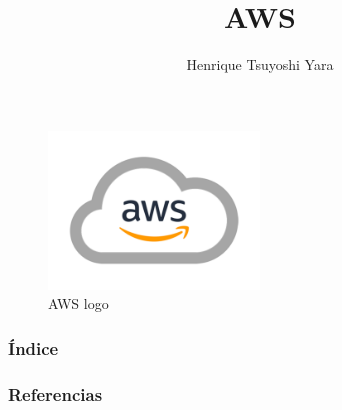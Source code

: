 \documentclass{beamer}
\title {AWS}
\author {Henrique Tsuyoshi Yara}
\institute {OPUS-software}
\begin{document}
\begin{frame}{\titlepage}
	\begin{figure}[htpb]
		\centering
		\includegraphics[width=0.5\textwidth]{aws-logo}
		\caption{AWS logo}
	\end{figure}
\end{frame}

\begin{frame}[allowframebreaks]
\frametitle{Índice}
\tableofcontents
\end{frame}















%
%

\begin{frame}[allowframebreaks]
\frametitle{Referencias}
\printbibliography
\end{frame}
\end{document}
